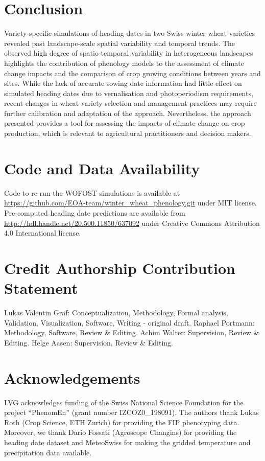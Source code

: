 \section{Conclusion}
Variety-specific simulations of heading dates in two Swiss winter wheat varieties revealed past landscape-scale spatial variability and temporal trends. The observed high degree of spatio-temporal variability in heterogeneous landscapes highlights the contribution of phenology models to the assessment of climate change impacts and the comparison of crop growing conditions between years and sites. While the lack of accurate sowing date information had little effect on simulated heading dates due to vernalisation and photoperiodism requirements, recent changes in wheat variety selection and management practices may require further calibration and adaptation of the approach. Nevertheless, the approach presented provides a tool for assessing the impacts of climate change on crop production, which is relevant to agricultural practitioners and decision makers.

\section*{Code and Data Availability}
Code to re-run the WOFOST simulations is available at \url{https://github.com/EOA-team/winter_wheat_phenology.git} under MIT license. Pre-computed heading date predictions are available from \url{http://hdl.handle.net/20.500.11850/637092} under Creative Commons Attribution 4.0 International license.

\section*{Credit Authorship Contribution Statement}
Lukas Valentin Graf: Conceptualization, Methodology, Formal analysis, Validation, Visualization, Software, Writing - original draft. Raphael Portmann: Methodology, Software, Review \& Editing. Achim Walter: Supervision, Review \& Editing. Helge Aasen:  Supervision, Review \& Editing.

\section*{Acknowledgements}
LVG acknowledges funding of the Swiss National Science Foundation for the project “PhenomEn” (grant number IZCOZ0\_198091). The authors thank Lukas Roth (Crop Science, ETH Zurich) for providing the FIP phenotyping data. Moreover, we thank Dario Fossati (Agroscope Changins) for providing the heading date dataset and MeteoSwiss for making the gridded temperature and precipitation data available.
